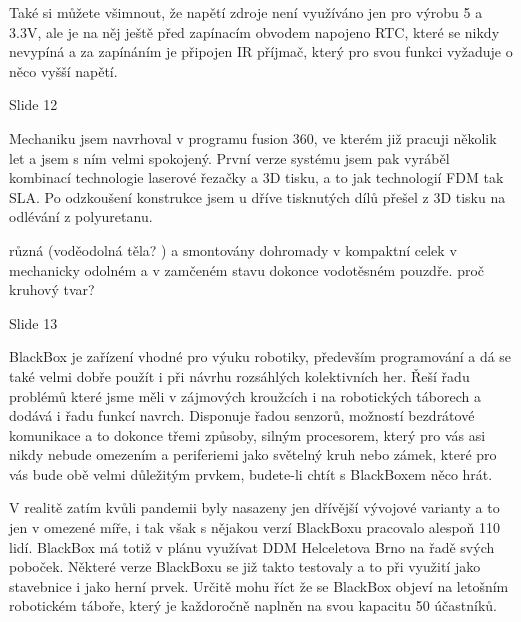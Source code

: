 Také si můžete všimnout, že napětí zdroje není využíváno jen pro výrobu 5 a 3.3V, 
ale je na něj ještě před zapínacím obvodem 
napojeno RTC, které se nikdy nevypíná a za zapínáním je připojen IR příjmač, 
který pro svou funkci vyžaduje o něco vyšší napětí.


Slide 12


Mechaniku jsem navrhoval v programu fusion 360, ve kterém již pracuji několik let a jsem s ním velmi spokojený.
První verze systému jsem pak vyráběl kombinací technologie laserové řezačky a 3D tisku, 
a to jak technologií FDM tak SLA.
Po odzkoušení konstrukce jsem u dříve tisknutých dílů přešel z 3D tisku na odlévání z polyuretanu. 


 různá (voděodolná těla? )
a smontovány dohromady v kompaktní celek v mechanicky odolném a v zamčeném stavu dokonce vodotěsném pouzdře.
 proč kruhový tvar? 


Slide 13

BlackBox je zařízení vhodné pro výuku robotiky, 
především programování a dá se také velmi dobře použít i při návrhu rozsáhlých 
kolektivních her. Řeší řadu problémů které jsme měli v zájmových kroužcích i na 
robotických táborech a dodává i řadu funkcí navrch.
Disponuje řadou senzorů, možností bezdrátové komunikace a to dokonce třemi způsoby, 
silným procesorem, který pro vás asi nikdy nebude omezením
a periferiemi jako světelný kruh nebo zámek, které pro vás bude obě velmi důležitým 
prvkem, budete-li chtít s BlackBoxem něco hrát.

V realitě zatím kvůli pandemii byly nasazeny jen dřívější vývojové varianty 
a to jen v omezené míře, i tak však s nějakou verzí BlackBoxu 
pracovalo alespoň 110 lidí.
BlackBox má totiž v plánu využívat DDM Helceletova Brno na řadě svých poboček.
Některé verze BlackBoxu se již takto testovaly a to při využití jako stavebnice 
i jako herní prvek. Určitě mohu říct že se BlackBox objeví 
na letošním robotickém táboře, který je každoročně naplněn na svou kapacitu 50 účastníků. 

